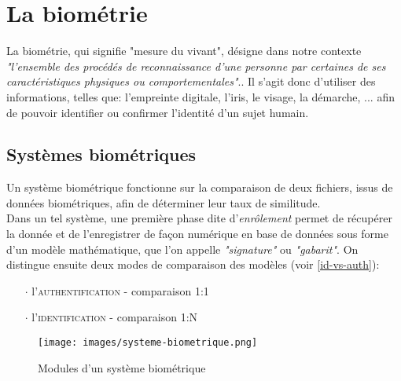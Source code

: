 \section{La biométrie}
La biométrie, qui signifie "mesure du vivant", désigne dans notre contexte \textit{"l'ensemble des procédés de reconnaissance d'une personne par certaines de ses caractéristiques physiques ou comportementales"}.\cite{Xmisc_3}. Il s'agit donc d'utiliser des informations, telles que: l'empreinte digitale, l'iris, le visage, la démarche, ... afin de pouvoir identifier ou confirmer l'identité d'un sujet humain.

\subsection{Systèmes biométriques}
Un système biométrique fonctionne sur la comparaison de deux fichiers, issus de données biométriques, afin de déterminer leur taux de similitude.
\\
Dans un tel système, une première phase dite d'\textit{enrôlement} permet de récupérer la donnée et de l'enregistrer de façon numérique en base de données sous forme d'un modèle mathématique, que l'on appelle \textit{"signature"} ou \textit{"gabarit"}. On distingue ensuite deux modes de comparaison des modèles (voir \ref{id-vs-auth}): 
\begin{itemize}
\item[$\cdot$]l'\textsc{authentification} - comparaison 1:1
\item[$\cdot$]l'\textsc{identification} - comparaison 1:N
\end{itemize}
\begin{figure}[h!]
\texttt{[image: images/systeme-biometrique.png]}
\caption{Modules d'un système biométrique}
\end{figure}

